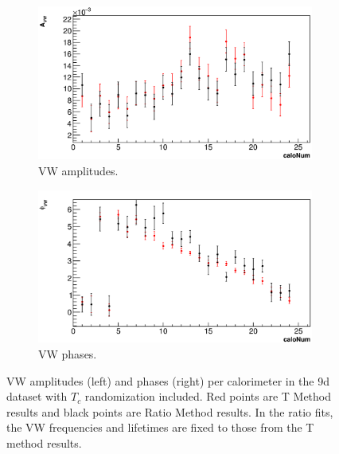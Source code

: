 \documentclass[12pt,letterpaper]{article}
\begin{document}
\begin{figure}[]
\centering
    \begin{subfigure}[]{0.46\textwidth}
        \centering
        \includegraphics[width=\textwidth]{9d-CaloFits-VW-Amps}
        \caption{VW amplitudes.}
    \end{subfigure}%
    \hspace{1cm}
    \begin{subfigure}[]{0.46\textwidth}
        \centering
        \includegraphics[width=\textwidth]{9d-CaloFits-VW-Phases}
        \caption{VW phases.}
    \end{subfigure}
\caption[]{VW amplitudes (left) and phases (right) per calorimeter in the 9d dataset with $T_{c}$ randomization included. Red points are T Method results and black points are Ratio Method results. In the ratio fits, the VW frequencies and lifetimes are fixed to those from the T method results.}
\label{fig:9d-PerCalo-VW}
\end{figure}
\end{document}
